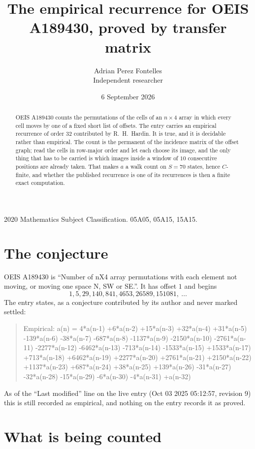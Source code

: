 \documentclass[11pt,a4paper]{article}
\title{The empirical recurrence for OEIS A189430, proved by transfer matrix}
\author{Adrian Perez Fontelles\\ \small Independent researcher}
\date{6 September 2026}
\theoremstyle{plain}
\theoremstyle{definition}
\begin{document}
\maketitle

\begin{abstract}
OEIS A189430 counts the permutations of the cells of an $n\times4$ array in which every cell
moves by one of a fixed short list of offsets. The entry carries an empirical recurrence of
order $32$ contributed by R.~H.~Hardin. It is true, and it is decidable rather than
empirical. The count is the permanent of the incidence matrix of the offset graph; read the
cells in row-major order and let each choose its image, and the only thing that has to be
carried is which images inside a window of $10$ consecutive positions are already taken.
That makes $a$ a walk count on $S=70$ states, hence $C$-finite, and whether the published
recurrence is one of its recurrences is then a finite exact computation.
\end{abstract}

\noindent\small 2020 Mathematics Subject Classification. 05A05, 05A15, 15A15.\normalsize

\section{The conjecture}

OEIS A189430 is ``Number of nX4 array permutations with each element not moving, or moving one space N, SW or SE.''. It has offset $1$ and begins
\[
1, 5, 29, 140, 841, 4653, 26589, 151081,\ \dots
\]
The entry states, as a conjecture contributed by its author and never marked settled:
\begin{quote}
Empirical: a(n) = 4*a(n-1) +6*a(n-2) +15*a(n-3) +32*a(n-4) +31*a(n-5) -139*a(n-6) -38*a(n-7) -687*a(n-8) -1137*a(n-9) -2150*a(n-10) -2761*a(n-11) -2277*a(n-12) -6462*a(n-13) -713*a(n-14) -1533*a(n-15) +1533*a(n-17) +713*a(n-18) +6462*a(n-19) +2277*a(n-20) +2761*a(n-21) +2150*a(n-22) +1137*a(n-23) +687*a(n-24) +38*a(n-25) +139*a(n-26) -31*a(n-27) -32*a(n-28) -15*a(n-29) -6*a(n-30) -4*a(n-31) +a(n-32)
\end{quote}
As of the ``Last modified'' line on the live entry (Oct 03 2025 05:12:57, revision 9) this is still
recorded as empirical, and nothing on the entry records it as proved.

\section{What is being counted}
\end{document}
